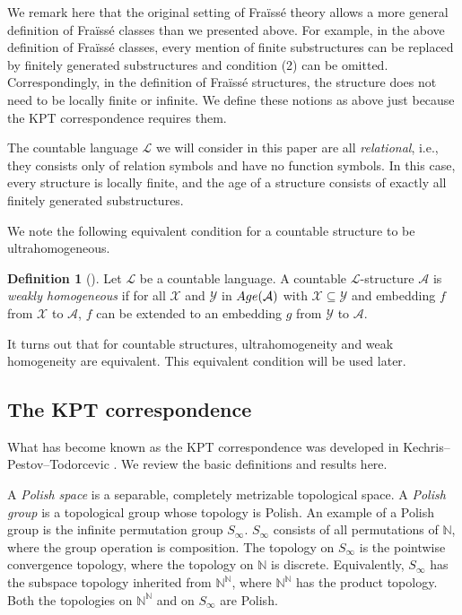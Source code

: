 \documentclass{amsart}
\theoremstyle{definition}
\newtheorem{definition}{Definition}[section]
\theoremstyle{remark}
\begin{document}
We remark here that the original setting of Fra\"iss\'e theory allows a more general definition of Fra\"iss\'e classes than we presented above. For example, in the above definition of Fra\"iss\'e classes, every mention of finite substructures can be replaced by finitely generated substructures and condition (2) can be omitted. Correspondingly, in the definition of Fra\"iss\'e structures, the structure does not need to be locally finite or infinite. We define these notions as above just because the KPT correspondence requires them.

The countable language $\mathcal{L}$ we will consider in this paper are all {\em relational}, i.e., they consists only of relation symbols and have no function symbols. In this case, every structure is locally finite, and the age of a structure consists of exactly all finitely generated substructures.

    We note the following equivalent condition for a countable structure to be ultrahomogeneous. 

    \begin{definition}[\cite{Hodges}]
        Let $\mathcal{L}$ be a countable language. A countable $\mathcal{L}$-structure $\mathcal{A}$ is {\em weakly homogeneous} if for all $\mathcal{X}$ and $\mathcal{Y}$ in ${\rm Age}(\mathcal{A})$ with $\mathcal{X} \subseteq \mathcal{Y}$ and embedding $f$ from $\mathcal{X}$ to $\mathcal{A}$, $f$ can be extended to an embedding $g$ from $\mathcal{Y}$ to $\mathcal{A}$. 
    \end{definition}

    It turns out that for countable structures, ultrahomogeneity and weak homogeneity are equivalent. This equivalent condition will be used later. 

\subsection{The KPT correspondence} What has become known as the KPT correspondence was developed in Kechris--Pestov--Todorcevic \cite{KPT}. We review the basic definitions and results here.

A {\em Polish space} is a separable, completely metrizable topological space. A {\em Polish group} is a topological group whose topology is Polish. An example of a Polish group is the infinite permutation group $S_\infty$. $S_\infty$ consists of all permutations of $\mathbb{N}$, where the group operation is composition. The topology on $S_\infty$ is the pointwise convergence topology, where the topology on $\mathbb{N}$ is discrete. Equivalently, $S_\infty$ has the subspace topology inherited from $\mathbb{N}^\mathbb{N}$, where $\mathbb{N}^\mathbb{N}$ has the product topology. Both the topologies on $\mathbb{N}^\mathbb{N}$ and on $S_\infty$ are Polish.
\end{document}
